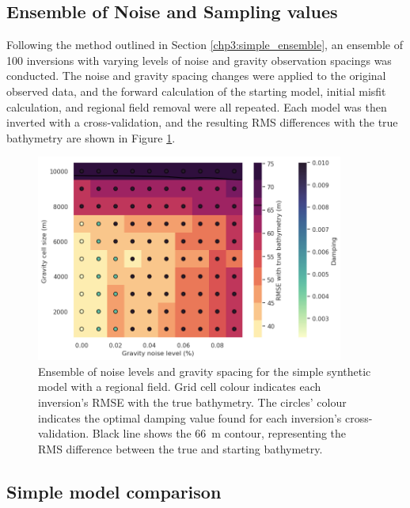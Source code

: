 \subsection{Ensemble of Noise and Sampling values} \label{chp3:simple_regional_ensemble}

Following the method outlined in Section \ref{chp3:simple_ensemble}, an ensemble of 100 inversions with varying levels of noise and gravity observation spacings was conducted. The noise and gravity spacing changes were applied to the original observed data, and the forward calculation of the starting model, initial misfit calculation, and regional field removal were all repeated. Each model was then inverted with a cross-validation, and the resulting RMS differences with the true bathymetry are shown in Figure \ref{fig:chp3_simple_regional_ensemble}. 

\begin{figure}[!ht]
    \centering
    \includegraphics[width=0.9\textwidth]{figures/chp3/chp3_simple_regional_ensemble.png}
    \caption[Gravity data ensemble with regional component]{Ensemble of noise levels and gravity spacing for the simple synthetic model with a regional field. Grid cell colour indicates each inversion's RMSE with the true bathymetry. The circles' colour indicates the optimal damping value found for each inversion's cross-validation. Black line shows the 66~m contour, representing the RMS difference between the true and starting bathymetry.}
    \label{fig:chp3_simple_regional_ensemble}
\end{figure}

\subsection{Simple model comparison}

